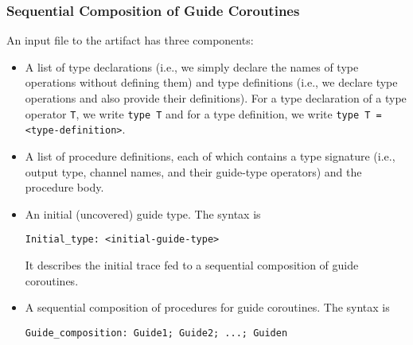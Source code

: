 \subsubsection{Sequential Composition of Guide Coroutines}

An input file to the artifact has three components:
\begin{itemize}
  \item A list of type declarations (i.e., we simply declare the names of type
        operations without defining them) and type definitions (i.e., we declare type
        operations and also provide their definitions).
        For a type declaration of a type operator \texttt{T}, we write \texttt{type T}
        and for a type definition, we write \texttt{type T = <type-definition>}.
  \item A list of procedure definitions, each of which contains a type signature
        (i.e., output type, channel names, and their guide-type operators) and the
        procedure body.
  \item An initial (uncovered) guide type.
        The syntax is
        \begin{verbatim}
Initial_type: <initial-guide-type>
\end{verbatim}
        It describes the initial trace fed to a sequential composition of guide
        coroutines.
  \item A sequential composition of procedures for guide coroutines.
        The syntax is
        \begin{verbatim}
Guide_composition: Guide1; Guide2; ...; Guiden
\end{verbatim}
\end{itemize}
